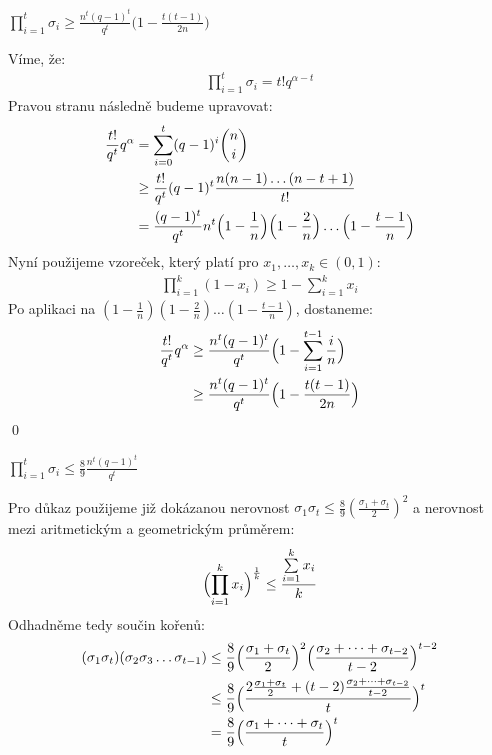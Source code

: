 \lm $\prod\limits_{i = 1}^t \sigma_i \geq \frac{n^t (q-1)^t}{q^t}\bigl(1 - \frac{t(t-1)}{2n}\bigr)$

\dk Víme, že:
\begin{align*}
\prod\limits_{i = 1}^t \sigma_i = t!q^{\alpha-t}
\end{align*}
Pravou stranu následně budeme upravovat:
\begin{align*}
\frac{t!}{q^t}q^\alpha &= \sum\limits_{i = 0}^{t}(q - 1)^i{n \choose i} \\
&\geq \frac{t!}{q^t} (q - 1)^t \frac{n(n-1)\dots(n-t+1)}{t!}  \\
&= \frac{(q-1)^t}{q^t} n^t \Bigl(1 - \frac{1}{n}\Bigr)\Bigl(1 - \frac{2}{n}\Bigr)\dots\Bigl(1 - \frac{t-1}{n}\Bigr)
\end{align*}
Nyní použijeme vzoreček, který platí pro $x_1,\dots,x_k \in (0,1)$:
\begin{align*}
\prod\limits_{i=1}^{k} (1 - x_i) \geq 1 - \sum\limits_{i=1}^{k} x_i
\end{align*}
Po aplikaci na $(1 - \frac{1}{n})(1 - \frac{2}{n})\dots(1 - \frac{t-1}{n})$, dostaneme:
\begin{align*}
\frac{t!}{q^t}q^\alpha &\geq \frac{n^t (q-1)^t}{q^t}\Bigl(1 - \sum\limits_{i=1}^{t-1} \frac{i}{n}\Bigr) \\
&\geq \frac{n^t (q-1)^t}{q^t}\Bigl(1 - \frac{t(t-1)}{2n}\Bigr) 
\end{align*}
\qed

\lm $\prod\limits_{i = 1}^t \sigma_i \leq \frac{8}{9}\frac{n^t(q-1)^t}{q^t}$

\dk Pro důkaz použijeme již dokázanou nerovnost $\sigma_1\sigma_t \leq \frac{8}{9}(\frac{\sigma_1+\sigma_t}{2})^2$ a nerovnost mezi aritmetickým a geometrickým průměrem:
\begin{align*}
\Bigl(\prod\limits_{i=1}^k x_i \Bigr)^{\frac{1}{k}} \leq \frac{\sum\limits_{i=1}^k x_i}{k}
\end{align*}
Odhadněme tedy součin kořenů:
\begin{align*}
(\sigma_1\sigma_t)(\sigma_2\sigma_3\dots\sigma_{t-1}) &\leq \frac{8}{9}\Bigl(\frac{\sigma_1+\sigma_t}{2}\Bigr)^2\Bigl(\frac{\sigma_2 + \dots + \sigma_{t-2}}{t-2}\Bigr)^{t-2} \\
&\leq \frac{8}{9} \Bigl(\frac{2\frac{\sigma_1 + \sigma_t}{2} + (t-2)\frac{\sigma_2 + \dots + \sigma_{t-2}}{t-2}}{t}\Bigr)^t \\
&=\frac{8}{9}\Bigl(\frac{\sigma_1 + \dots + \sigma_t}{t}\Bigr)^t
\end{align*}




